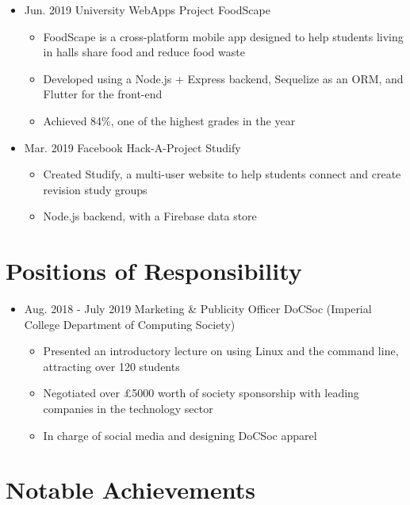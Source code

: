 \documentclass[11pt,a4paper,sans]{moderncv}        %
\begin{document}
\begin{itemize}

\item{
\cventry
{Jun. 2019}
{University WebApps Project}
{FoodScape}
{}{}{
\begin{itemize}
\item FoodScape is a cross-platform mobile app designed to help students living in halls share food and reduce food waste
\item Developed using a Node.js + Express backend, Sequelize as an ORM, and Flutter for the front-end
\item Achieved 84\%, one of the highest grades in the year 
\end{itemize}
}}

\item{
\cventry
{Mar. 2019}
{Facebook Hack-A-Project}
{Studify}
{}{}{
\begin{itemize}
\item Created Studify, a multi-user website to help students connect and create revision study groups
\item Node.js backend, with a Firebase data store
\end{itemize}
}}

\end{itemize}

\section{Positions of Responsibility}

\begin{itemize}

\item{
\cventry
{Aug. 2018 - July 2019}
{Marketing \& Publicity Officer}
{DoCSoc (Imperial College Department of Computing Society)}
{}{}{
\begin{itemize}
\item Presented an introductory lecture on using Linux and the command line, attracting over 120 students
\item Negotiated over £5000 worth of society sponsorship with leading companies in the technology sector
\item In charge of social media and designing DoCSoc apparel
\end{itemize}
}}

\end{itemize}

\section{Notable Achievements}
\end{document}
